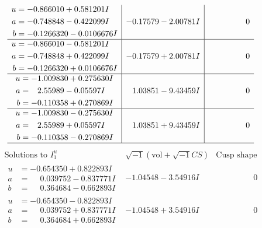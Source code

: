 \documentclass[1p]{elsarticle_modified}
\theoremstyle{definition}
\newcommand{\I}{\sqrt{-1}}
\begin{document}
$$\begin{array}{c|c|c}
\begin{aligned}
u &= -0.866010 + 0.581201 I \\
a &= -0.748848 - 0.422099 I \\
b &= -0.1266320 - 0.0106676 I\end{aligned}
 & -0.17579 - 2.00781 I & \phantom{-0.000000 } 0 \\ \hline\begin{aligned}
u &= -0.866010 - 0.581201 I \\
a &= -0.748848 + 0.422099 I \\
b &= -0.1266320 + 0.0106676 I\end{aligned}
 & -0.17579 + 2.00781 I & \phantom{-0.000000 } 0 \\ \hline\begin{aligned}
u &= -1.009830 + 0.275630 I \\
a &= \phantom{-}2.55989 - 0.05597 I \\
b &= -0.110358 + 0.270869 I\end{aligned}
 & \phantom{-}1.03851 - 9.43459 I & \phantom{-0.000000 } 0 \\ \hline\begin{aligned}
u &= -1.009830 - 0.275630 I \\
a &= \phantom{-}2.55989 + 0.05597 I \\
b &= -0.110358 - 0.270869 I\end{aligned}
 & \phantom{-}1.03851 + 9.43459 I & \phantom{-0.000000 } 0\\
 \hline 
 \end{array}$$\newpage$$\begin{array}{c|c|c}  
\text{Solutions to }I^u_{1}& \I (\text{vol} + \sqrt{-1}CS) & \text{Cusp shape}\\
 \hline 
\begin{aligned}
u &= -0.654350 + 0.822893 I \\
a &= \phantom{-}0.039752 - 0.837771 I \\
b &= \phantom{-}0.364684 - 0.662893 I\end{aligned}
 & -1.04548 - 3.54916 I & \phantom{-0.000000 } 0 \\ \hline\begin{aligned}
u &= -0.654350 - 0.822893 I \\
a &= \phantom{-}0.039752 + 0.837771 I \\
b &= \phantom{-}0.364684 + 0.662893 I\end{aligned}
 & -1.04548 + 3.54916 I & \phantom{-0.000000 } 0 \\ \hline\begin{aligned}

\end{aligned}
\end{array}$$
\end{document}
